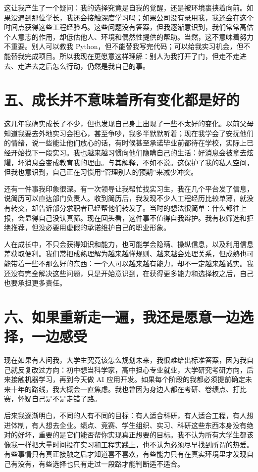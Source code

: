 \documentclass[UTF8,zihao=5,openany]{ctexbook}
\begin{document}
这让我产生了一个疑问：我的选择究竟是自我的觉醒，还是被环境裹挟着向前。如果没遇到那位学长，我还会接触深度学习吗；如果公司没有录用我，我还会在这个时间点获得这些工程经验吗。这些问题没有答案，但我逐渐意识到，我们常常高估个人意志的作用，却低估他人、环境和偶然性提供的帮助。当然，这不意味着努力不重要。别人可以教我 Python，但不能替我写完代码；可以给我实习机会，但不能替我完成项目。所以我现在更愿意这样理解：别人为我打开了门，但走不走进去、走进去之后怎么行动，仍然是我自己的事。

\section*{五、成长并不意味着所有变化都是好的}

这几年我确实成长了不少，但也发现自己身上出现了一些不太好的变化。以前父母知道我要去外地实习会担心，甚至争吵，我多半默默听着；现在我学会了安抚他们的情绪，说一些能让他们放心的话，有时候甚至承诺毕业前都待在学校，实际上已经开始找下一段实习。我也越来越习惯向他们隐瞒自己的生活：好消息会被拿去炫耀，坏消息会变成教育我的理由。与其解释，不如不说。这保护了我的私人空间，但我也意识到，自己正在习惯用“管理别人的预期”来减少冲突。

还有一件事我印象很深。有一次领导让我帮忙找实习生，我在几个平台发了信息，说简历可以直达部门负责人。收到简历后，我发现不少人工程经历比较单薄，就没有转交，却告诉部分求职者已经帮他们转发了。当时的想法很简单：什么都往上报，会显得自己没认真筛。现在回头看，这件事不值得自我辩护。我有权筛选和拒绝推荐，但没必要用虚假的承诺维护自己的职业形象。

人在成长中，不只会获得知识和能力，也可能学会隐瞒、操纵信息，以及利用信息差获取便利。我们常把成熟理解为越来越懂规则、越来越会处理关系，但成熟也可能带着一些不那么好的东西：一个人可以越来越有能力，却不一定越来越诚实。我还没有完全解决这些问题，只是开始意识到，在获得更多能力和选择权之后，自己也要承担更多责任。

\section*{六、如果重新走一遍，我还是愿意一边选择，一边感受}

现在如果有人问我，大学生究竟该怎么规划未来，我很难给出标准答案，因为我自己就反复改过方向：初中想当科学家，高中担心专业就业，大学研究考研方向，后来接触机器学习，再到今天做 AI 应用开发。如果每个阶段的我都必须提前确定未来十年的路线，我大概会一直焦虑。我也曾因为身边人都在考研、卷绩点、打比赛，怀疑自己是不是走错了路。

后来我逐渐明白，不同的人有不同的目标：有人适合科研，有人适合工程，有人想进体制，有人想去企业。绩点、竞赛、学生组织、实习、科研这些东西本身没有绝对的好坏，重要的是它们能否帮你实现真正想要的目标。我不认为所有大学生都该像我一样把大量时间投在实习和工程实践上，也不认为必须尽早找到所谓的热爱。有些事情只有真正接触之后才知道喜不喜欢，有些能力只有在真实环境里才发现自己有没有，有些选择也只有走过一段路才能判断适不适合。
\end{document}
